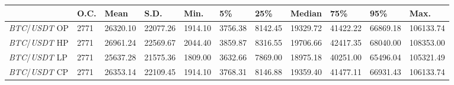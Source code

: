\begin{tabular}{lllllllllll}
\toprule
 & \textbf{O.C.} & \textbf{Mean} & \textbf{S.D.} & \textbf{Min.} & \textbf{5\%} & \textbf{25\%} & \textbf{Median} & \textbf{75\%} & \textbf{95\%} & \textbf{Max.} \\
\midrule
\emph{BTC}/\emph{USDT} OP & 2771 & 26320.10 & 22077.26 & 1914.10 & 3756.38 & 8142.45 & 19329.72 & 41422.22 & 66869.18 & 106133.74 \\
\emph{BTC}/\emph{USDT} HP & 2771 & 26961.24 & 22569.67 & 2044.40 & 3859.87 & 8316.55 & 19706.66 & 42417.35 & 68040.00 & 108353.00 \\
\emph{BTC}/\emph{USDT} LP & 2771 & 25637.28 & 21575.36 & 1809.00 & 3632.66 & 7869.00 & 18975.18 & 40251.00 & 65496.04 & 105321.49 \\
\emph{BTC}/\emph{USDT} CP & 2771 & 26353.14 & 22109.45 & 1914.10 & 3768.31 & 8146.88 & 19359.40 & 41477.11 & 66931.43 & 106133.74 \\
\bottomrule
\end{tabular}
